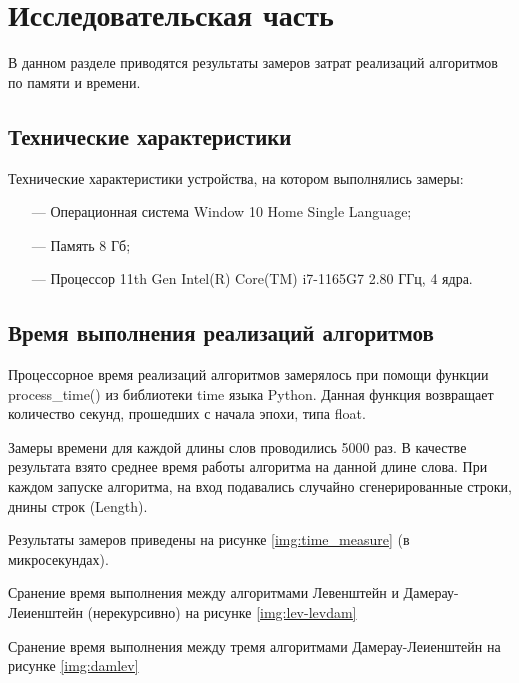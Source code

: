 \chapter{Исследовательская часть}

В данном разделе приводятся результаты замеров затрат реализаций алгоритмов по памяти и времени.

\section{Технические характеристики}

Технические характеристики устройства, на котором выполнялись замеры:

\begin{itemize}
	\item[---] Операционная система Window 10 Home Single Language;
	\item[---] Память 8 Гб;
	\item[---] Процессор 11th Gen Intel(R) Core(TM) i7-1165G7 2.80 ГГц, 4 ядра.
\end{itemize}

\section{Время выполнения реализаций алгоритмов}

Процессорное время реализаций алгоритмов замерялось при помощи функции process\_time() из библиотеки time языка Python. Данная функция возвращает количество секунд, прошедших с начала эпохи, типа float.

Замеры времени для каждой длины слов проводились 5000 раз. В качестве результата взято среднее время работы алгоритма на данной длине слова. При каждом запуске алгоритма, на вход подавались случайно сгенерированные строки, днины строк (Length).

Результаты замеров приведены на рисунке \ref{img:time_measure} (в микросекундах).

\newpage

Сранение время выполнения между алгоритмами Левенштейн и Дамерау-Леиенштейн (нерекурсивно) на рисунке \ref{img:lev-levdam}
 


Сранение время выполнения между тремя алгоритмами Дамерау-Леиенштейн на рисунке \ref{img:damlev}

